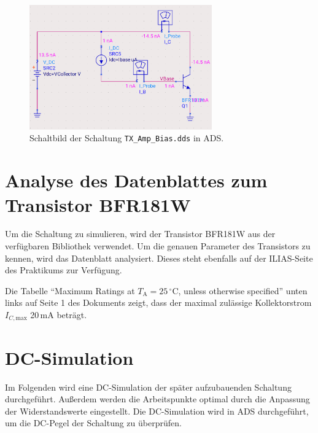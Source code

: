\begin{figure}[h]
    \centering
    \includegraphics[width=0.7\textwidth]{Pictures/TX_BIAS.png}
    \caption{Schaltbild der Schaltung \texttt{TX\_Amp\_Bias.dds} in \ac{ADS}.}
    \label{fig:TX_BIAS}
\end{figure}

\section{Analyse des Datenblattes zum Transistor BFR181W}
Um die Schaltung zu simulieren, wird der Transistor BFR181W aus der verfügbaren Bibliothek verwendet. Um die genauen Parameter des Transistors zu kennen, wird das Datenblatt analysiert.
Dieses steht ebenfalls auf der ILIAS-Seite des Praktikums zur Verfügung.

Die Tabelle \enquote{Maximum Ratings at $T_\mathrm{A}=25\,^\circ\mathrm{C}$, unless otherwise specified} unten links auf Seite 1 des Dokuments zeigt, dass der maximal zulässige Kollektorstrom $I_{C,\mathrm{max}}$ 20\,mA beträgt.

\section{DC-Simulation}
Im Folgenden wird eine DC-Simulation der später aufzubauenden Schaltung durchgeführt. 
Außerdem werden die Arbeitspunkte optimal durch die Anpassung der Widerstandswerte eingestellt.
Die DC-Simulation wird in \ac{ADS} durchgeführt, um die DC-Pegel der Schaltung zu überprüfen.

